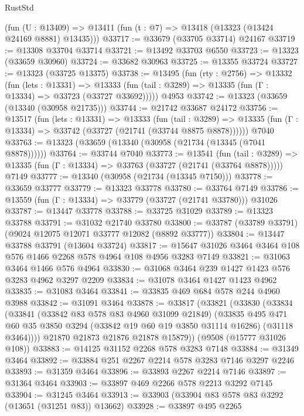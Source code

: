 \begin{lexlean}{RustStd}
\begin{coremodule}
    (fun (U : @13409) => @13411 (fun (t : @7) => @13418 (@13323 (@13424 @24169 @8881) @13435)))
@33717 := @33679 (@33705 @33714) @24167
@33719 := @13308 @33704 @33714
@33721 := @13492 @33703 @6550
@33723 := @13323 (@33659 @30960)
@33724 := @33682 @30963
@33725 := @13355 @33724
@33727 := @13323 (@33725 @13375)
@33738 := @13495
    (fun (rty : @2756) =>
    @13332
      (fun (lets : @13331) =>
      @13333 (fun (tail : @3289) => @13335 (fun (Γ : @13334) => @33723 (@33727 @33692)))))
    @4953
@33742 := @13323 (@33659 (@13340 (@30958 @21735)))
@33744 := @21742 @33687 @24172
@33756 := @13517
    (fun (lets : @13331) =>
    @13333
      (fun (tail : @3289) =>
      @13335 (fun (Γ : @13334) => @33742 (@33727 (@21741 (@33744 @8875 @8878))))))
    @7040
@33763 := @13323 (@33659 (@13340 (@30958 (@21734 (@13345 (@7041 @8878))))))
@33764 := @33744 @7040
@33773 := @13541
    (fun (tail : @3289) => @13335 (fun (Γ : @13334) => @33763 (@33727 (@21741 (@33764 @8878)))))
    @7149
@33777 := @13340 (@30958 (@21734 (@13345 @7150)))
@33778 := @33659 @33777
@33779 := @13323 @33778
@33780 := @33764 @7149
@33786 := @13559 (fun (Γ : @13334) => @33779 (@33727 (@21741 @33780))) @31026
@33787 := @13447 @33778
@33788 := @33725 @31029
@33789 := @13323 @33788
@33791 := @31032 @21740 @33780
@33800 := @33787 (@33789 @33791) (@9024 @12075 @12071 @33777 @12082 (@8892 @33777))
@33804 := @13447 @33788 @33791 (@13604 @33724)
@33817 := @15647 @31026 @3464 @3464 @108 @576 @1466 @2268 @578 @4964 @108 @4956 @3283 @7149
@33821 := @31063 @3464 @1466 @576 @4964
@33830 := @31068 @3464 @239 @1427 @1423 @576 @3283 @4962 @3297 @2209
@33834 := @31078 @3464 @1427 @1423 @4962
@33835 := @31083 @3464
@33841 := @33835 @469 @684 @578 @244 @4960 @3988
@33842 := @31091 @3464
@33878 := @33817
    (@33821
      (@33830
        (@33834
          (@33841
            (@33842 @83 @578 @83 @4960 @31099 @21849)
            (@33835
              @495
              @471
              @60
              @35
              @3850
              @3294
              (@33842 @19 @60 @19 @3850 @31114 @16286)
              (@31118 @3464))))
        @21870
        @21873
        @21876
        @21878
        @15879))
    (@9508 (@15777 @31026 @108))
@33883 := @14125 @31152 @2268 @578 @3283 @7148
@33884 := @31349 @3464
@33892 := @33884 @251 @2267 @2214 @578 @3283 @7146 @3297 @2246
@33893 := @31359 @3464
@33896 := @33893 @2267 @2214 @7146
@33897 := @31364 @3464
@33903 := @33897 @469 @2266 @578 @2213 @3292 @7145
@33904 := @31245 @3464
@33913 := @33903 (@33904 @83 @578 @83 @3292 (@13651 (@31251 @83)) @13662)
@33928 := @33897
    @495
    @2265

\end{coremodule}
\end{lexlean}
